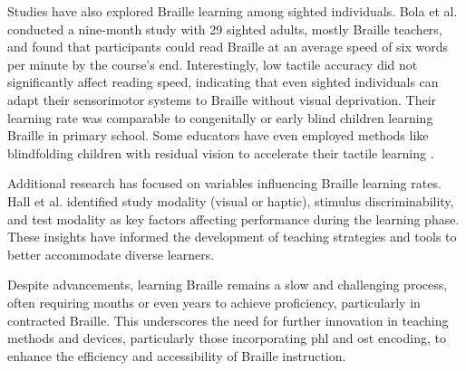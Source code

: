 Studies have also explored Braille learning among sighted individuals. Bola et al. \cite{Bola2016} conducted a nine-month study with 29 sighted adults, mostly Braille teachers, and found that participants could read Braille at an average speed of six words per minute by the course’s end. Interestingly, low tactile accuracy did not significantly affect reading speed, indicating that even sighted individuals can adapt their sensorimotor systems to Braille without visual deprivation. Their learning rate was comparable to congenitally or early blind children learning Braille in primary school. Some educators have even employed methods like blindfolding children with residual vision to accelerate their tactile learning \cite{Bola2016}.

Additional research has focused on variables influencing Braille learning rates. Hall et al. \cite{Hall1987} identified study modality (visual or haptic), stimulus discriminability, and test modality as key factors affecting performance during the learning phase. These insights have informed the development of teaching strategies and tools to better accommodate diverse learners.

Despite advancements, learning Braille remains a slow and challenging process, often requiring months or even years to achieve proficiency, particularly in contracted Braille. This underscores the need for further innovation in teaching methods and devices, particularly those incorporating \gls{phl} and \gls{ost} encoding, to enhance the efficiency and accessibility of Braille instruction.





